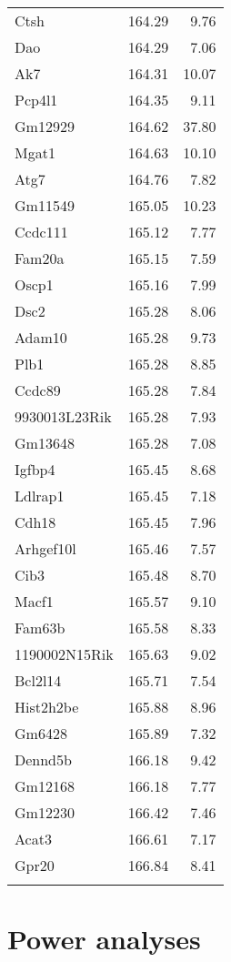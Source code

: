 \documentclass{book}
\begin{document}
{\begin{longtable}{lrr}
  Ctsh & 164.29 & 9.76 \\
  Dao & 164.29 & 7.06 \\
  Ak7 & 164.31 & 10.07 \\
  Pcp4l1 & 164.35 & 9.11 \\
  Gm12929 & 164.62 & 37.80 \\
  Mgat1 & 164.63 & 10.10 \\
  Atg7 & 164.76 & 7.82 \\
  Gm11549 & 165.05 & 10.23 \\
  Ccdc111 & 165.12 & 7.77 \\
  Fam20a & 165.15 & 7.59 \\
  Oscp1 & 165.16 & 7.99 \\
  Dsc2 & 165.28 & 8.06 \\
  Adam10 & 165.28 & 9.73 \\
  Plb1 & 165.28 & 8.85 \\
  Ccdc89 & 165.28 & 7.84 \\
  9930013L23Rik & 165.28 & 7.93 \\
  Gm13648 & 165.28 & 7.08 \\
  Igfbp4 & 165.45 & 8.68 \\
  Ldlrap1 & 165.45 & 7.18 \\
  Cdh18 & 165.45 & 7.96 \\
  Arhgef10l & 165.46 & 7.57 \\
  Cib3 & 165.48 & 8.70 \\
  Macf1 & 165.57 & 9.10 \\
  Fam63b & 165.58 & 8.33 \\
  1190002N15Rik & 165.63 & 9.02 \\
  Bcl2l14 & 165.71 & 7.54 \\
  Hist2h2be & 165.88 & 8.96 \\
  Gm6428 & 165.89 & 7.32 \\
  Dennd5b & 166.18 & 9.42 \\
  Gm12168 & 166.18 & 7.77 \\
  Gm12230 & 166.42 & 7.46 \\
  Acat3 & 166.61 & 7.17 \\
  Gpr20 & 166.84 & 8.41 \\
   \hline
  
  \label{tab:hot-annot}

\end{longtable}
}

\section{Power analyses}
\end{document}
